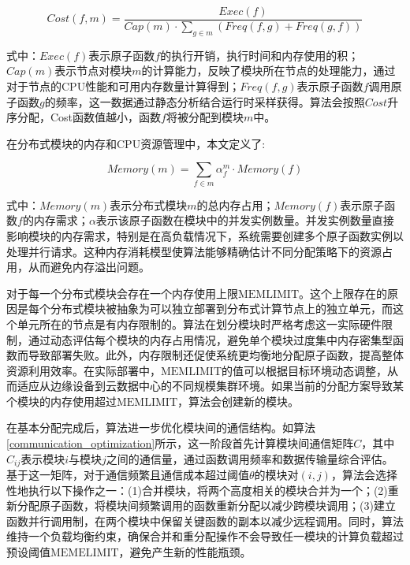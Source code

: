 \begin{equation}
	Cost(f, m) = \frac{Exec(f)}{Cap(m) \cdot \sum_{g \in m} (Freq(f, g) + Freq(g,f))}
\end{equation}

\noindent 式中：$Exec(f)$表示原子函数$f$的执行开销，执行时间和内存使用的积；$Cap(m)$表示节点对模块$m$的计算能力，反映了模块所在节点的处理能力，通过对于节点的CPU性能和可用内存数量计算得到；$Freq(f, g)$表示原子函数$f$调用原子函数$g$的频率，这一数据通过静态分析结合运行时采样获得。算法会按照$Cost$升序分配，Cost函数值越小，函数$f$将被分配到模块$m$中。

在分布式模块的内存和CPU资源管理中，本文定义了:

\begin{equation}
\label{eq:memory}
	Memory(m) = \sum_{f \in m} \alpha_f^m \cdot Memory(f)
\end{equation}

\noindent 式中：$Memory(m)$表示分布式模块$m$的总内存占用；$Memory(f)$表示原子函数$f$的内存需求；$\alpha$表示该原子函数在模块中的并发实例数量。并发实例数量直接影响模块的内存需求，特别是在高负载情况下，系统需要创建多个原子函数实例以处理并行请求。这种内存消耗模型使算法能够精确估计不同分配策略下的资源占用，从而避免内存溢出问题。


对于每一个分布式模块会存在一个内存使用上限$\text{MEMLIMIT}$。这个上限存在的原因是每个分布式模块被抽象为可以独立部署到分布式计算节点上的独立单元，而这个单元所在的节点是有内存限制的。算法在划分模块时严格考虑这一实际硬件限制，通过动态评估每个模块的内存占用情况，避免单个模块过度集中内存密集型函数而导致部署失败。此外，内存限制还促使系统更均衡地分配原子函数，提高整体资源利用效率。在实际部署中，$\text{MEMLIMIT}$的值可以根据目标环境动态调整，从而适应从边缘设备到云数据中心的不同规模集群环境。如果当前的分配方案导致某个模块的内存使用超过$\text{MEMLIMIT}$，算法会创建新的模块。


在基本分配完成后，算法进一步优化模块间的通信结构。如算法\ref{communication_optimization}所示，这一阶段首先计算模块间通信矩阵$C$，其中$C_{ij}$表示模块$i$与模块$j$之间的通信量，通过函数调用频率和数据传输量综合评估。基于这一矩阵，对于通信频繁且通信成本超过阈值$\theta$的模块对$(i,j)$，算法会选择性地执行以下操作之一：(1)合并模块，将两个高度相关的模块合并为一个；(2)重新分配原子函数，将模块间频繁调用的函数重新分配以减少跨模块调用；(3)建立函数并行调用制，在两个模块中保留关键函数的副本以减少远程调用。同时，算法维持一个负载均衡约束，确保合并和重分配操作不会导致任一模块的计算负载超过预设阈值$\text{MEMELIMIT}$，避免产生新的性能瓶颈。

